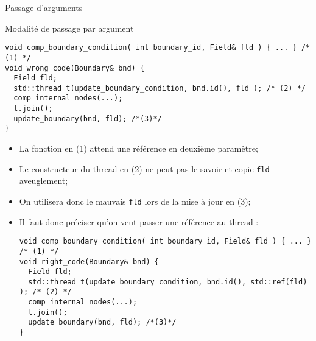 \documentclass[handout,10pt]{beamer}
\begin{document}
\begin{frame}[fragile]{Passage d'arguments}
\tiny
\begin{block}{Modalité de passage par argument}
\begin{lstlisting}
void comp_boundary_condition( int boundary_id, Field& fld ) { ... } /* (1) */
void wrong_code(Boundary& bnd) {
  Field fld;
  std::thread t(update_boundary_condition, bnd.id(), fld ); /* (2) */
  comp_internal_nodes(...);
  t.join();
  update_boundary(bnd, fld); /*(3)*/
}
\end{lstlisting}
\begin{itemize}
 \item 	La fonction en {\color{red}(1)} attend une référence en deuxième paramètre;
 \item Le constructeur du thread en {\color{red}(2)} ne peut pas le savoir et copie \lstinline$fld$ aveuglement;
 \item On utilisera donc le mauvais \lstinline$fld$ lors de la mise à jour en {\color{red}(3)};
 \item Il faut donc préciser qu'on veut passer une référence au thread :
\begin{lstlisting}
void comp_boundary_condition( int boundary_id, Field& fld ) { ... } /* (1) */
void right_code(Boundary& bnd) {
  Field fld;
  std::thread t(update_boundary_condition, bnd.id(), std::ref(fld) ); /* (2) */
  comp_internal_nodes(...);
  t.join();
  update_boundary(bnd, fld); /*(3)*/
}
\end{lstlisting} 
\end{itemize}
\end{block}
\end{frame}
\end{document}

